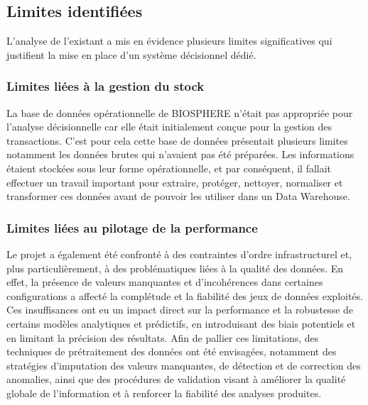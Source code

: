 \subsection{Limites identifiées}
L'analyse de l'existant a mis en évidence plusieurs limites significatives qui justifient la mise en place d'un système décisionnel dédié.
\subsubsection{Limites liées à la gestion du stock}
La base de données opérationnelle de BIOSPHERE n'était pas appropriée pour l'analyse décisionnelle car elle était initialement conçue pour la gestion des transactions. C’est pour cela cette base de données présentait plusieurs limites notamment les données brutes qui n'avaient pas été préparées. Les informations étaient stockées sous leur forme opérationnelle, et par conséquent, il fallait effectuer un travail important pour extraire, protéger, nettoyer, normaliser et transformer ces données avant de pouvoir les utiliser dans un Data Warehouse.

\subsubsection{Limites liées au pilotage de la performance}
Le projet a également été confronté à des contraintes d’ordre infrastructurel et, plus particulièrement, à des problématiques liées à la qualité des données. En effet, la présence de valeurs manquantes et d’incohérences dans certaines configurations a affecté la complétude et la fiabilité des jeux de données exploités. Ces insuffisances ont eu un impact direct sur la performance et la robustesse de certains modèles analytiques et prédictifs, en introduisant des biais potentiels et en limitant la précision des résultats.
Afin de pallier ces limitations, des techniques de prétraitement des données ont été envisagées, notamment des stratégies d’imputation des valeurs manquantes, de détection et de correction des anomalies, ainsi que des procédures de validation visant à améliorer la qualité globale de l’information et à renforcer la fiabilité des analyses produites.

